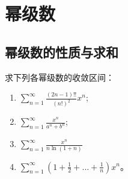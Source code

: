 \chapter{幂级数}

\section{幂级数的性质与求和}

\begin{problem}
    求下列各幂级数的收敛区间：
    \begin{enumerate}
        \item \(\sum_{n=1}^{\infty} \frac{(2n-1)!!}{(n!)^2} x^n\);
        \item \(\sum_{n=1}^{\infty} \frac{x^{n}}{a^{n} + b^{n}}\);
        \item \(\sum_{n=1}^{\infty} \frac{x^n}{n \ln(1+n)}\)
        \item \(\sum_{n=1}^{\infty} \left(1 + \frac{1}{2} + \dots +
            \frac{1}{n}\right) x^n\)。
    \end{enumerate}
\end{problem}

